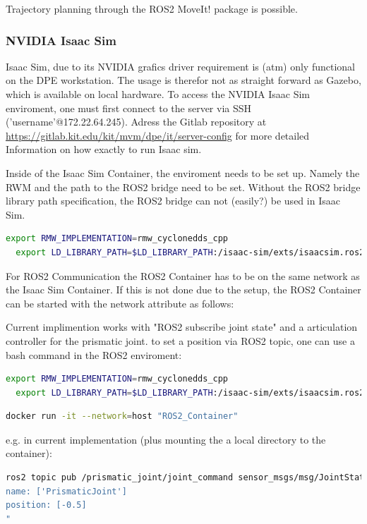 \documentclass{ltxdockit}
\begin{document}
Trajectory planning through the ROS2 MoveIt! package is possible.

\subsubsection{NVIDIA Isaac Sim}
\label{sec:robotics:simulation:nvidia_isaac_sim}

Isaac Sim, due to its NVIDIA grafics driver requirement is (atm) only functional on the DPE workstation. The usage is therefor not as straight forward as Gazebo, which is available on local hardware. To access the NVIDIA Isaac Sim enviroment, one must first connect to the server via SSH ('username'@172.22.64.245). Adress the Gitlab repository at \url{https://gitlab.kit.edu/kit/mvm/dpe/it/server-config} for more detailed Information on how exactly to run Isaac sim. 

Inside of the Isaac Sim Container, the enviroment needs to be set up. Namely the RWM and the path to the ROS2 bridge need to be set. Without the ROS2 bridge library path specification, the ROS2 bridge can not (easily?) be used in Isaac Sim.

\begin{lstlisting}[language=bash]
  export RMW_IMPLEMENTATION=rmw_cyclonedds_cpp
  export LD_LIBRARY_PATH=$LD_LIBRARY_PATH:/isaac-sim/exts/isaacsim.ros2.bridge/humble/lib
\end{lstlisting}

For ROS2 Communication the ROS2 Container has to be on the same network as the Isaac Sim Container. If this is not done due to the setup, the ROS2 Container can be started with the network attribute as follows:

Current implimention works with "ROS2 subscribe joint state" and a articulation controller for the prismatic joint. to set a position via ROS2 topic, one can use a bash command in the ROS2 enviroment:

\begin{lstlisting}[language=bash]
  export RMW_IMPLEMENTATION=rmw_cyclonedds_cpp
  export LD_LIBRARY_PATH=$LD_LIBRARY_PATH:/isaac-sim/exts/isaacsim.ros2.bridge/humble/lib
\end{lstlisting}


\begin{lstlisting}[language=bash]
  docker run -it --network=host "ROS2_Container"
\end{lstlisting}
e.g. in current implementation (plus mounting the a local directory to the container):
\begin{lstlisting}[language=bash]
ros2 topic pub /prismatic_joint/joint_command sensor_msgs/msg/JointState "
name: ['PrismaticJoint']
position: [-0.5]
"
\end{lstlisting}
\end{document}
